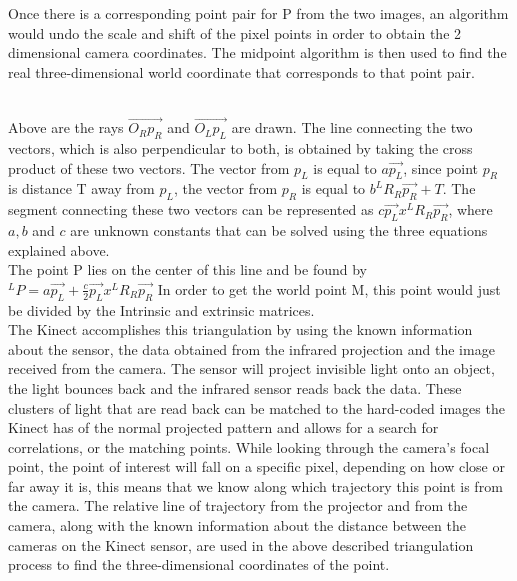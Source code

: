 \documentclass[12pt,twocolumn]{article}
\begin{document}
\indent Once there is a corresponding point pair for P from the two images, an algorithm would undo the scale and shift of the pixel points in order to obtain the 2 dimensional camera coordinates. The midpoint algorithm is then used to find the real three-dimensional world coordinate that corresponds to that point pair.\\ 
  \\
\indent Above are the rays $\vec{O_{R}p_{R}}$ and $\vec{O_{L}p_{L}}$ are drawn. The line connecting the two vectors, which is also perpendicular to both, is obtained by taking the cross product of these two vectors. The vector from $p_{L}$ is equal to $a\vec{p_{L}}$, since point $p_{R}$ is distance T away from $p_{L}$, the vector from $p_{R}$ is equal to $b^{L}R_{R}\vec{p_{R}}+T$. The segment connecting these two vectors can be represented as $c\vec{p_{L}}x^{L}R_{R}\vec{p_{R}}$, where $a,b$ and $c$ are unknown constants that can be solved using the three equations explained above. \\
The point P lies on the center of this line and be found by $^{L}P=a\vec{p_{L}}+\frac{c}{2}\vec{p_{L}}x^{L}R_{R}\vec{p_{R}}$ In order to get the world point M, this point would just be divided by the Intrinsic and extrinsic matrices.\\


\indent  The Kinect accomplishes this triangulation by using the known information about the sensor, the data obtained from the infrared projection and the image received from the camera. The sensor will project invisible light onto an object, the light bounces back and the infrared sensor reads back the data. These clusters of light that are read back can be matched to the hard-coded images the Kinect has of the normal projected pattern and allows for a search for correlations, or the matching points. While looking through the camera's focal point, the point of interest will fall on a specific pixel, depending on how close or far away it is, this means that we know along which trajectory this point is from the camera. The relative line of trajectory from the projector and from the camera, along with the known information about the distance between the cameras on the Kinect sensor, are used in the above described triangulation process to find the three-dimensional coordinates of the point. \\
\end{document}
